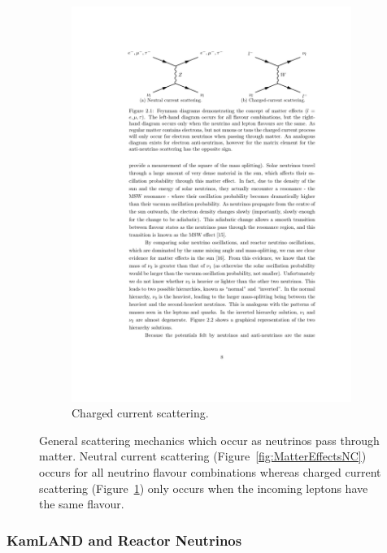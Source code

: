 \begin{figure}
\begin{subfigure}{0.48\linewidth}
    \includegraphics{MatterEffectsCC.pdf}
    \caption{Charged current scattering.}
    \label{fig:MatterEffectsCC}
  \end{subfigure}
  \caption[General scattering mechanics which occur as neutrinos pass through matter.]{General scattering mechanics which occur as neutrinos pass through matter.  Neutral current scattering (Figure~\ref{fig:MatterEffectsNC}) occurs for all neutrino flavour combinations whereas charged current scattering (Figure~\ref{fig:MatterEffectsCC}) only occurs when the incoming leptons have the same flavour.}
  \label{fig:MatterEffects}
\end{figure}

\subsubsection{KamLAND and Reactor Neutrinos}\label{sec:KamLAND}

